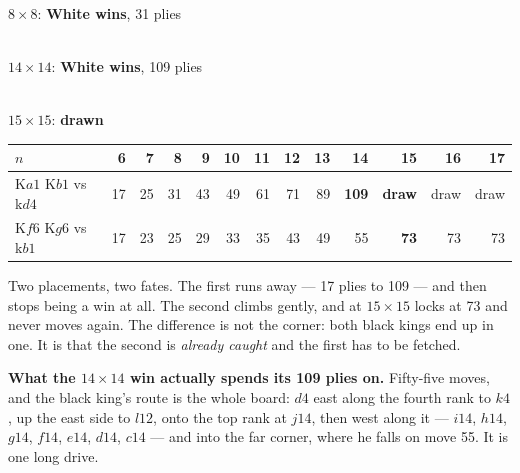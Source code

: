 \documentclass[11pt]{article}
\begin{document}
\smallskip

\begin{minipage}{0.30\textwidth}\centering
  \\[1mm]
  {\scriptsize\color{inksoft}$8\times8$: \textbf{White wins}, 31 plies}
\end{minipage}\hfill
\begin{minipage}{0.32\textwidth}\centering
  \\[1mm]
  {\scriptsize\color{inksoft}$14\times14$: \textbf{White wins}, 109 plies}
\end{minipage}\hfill
\begin{minipage}{0.32\textwidth}\centering
  \\[1mm]
  {\scriptsize\color{inksoft}$15\times15$: \textbf{drawn}}
\end{minipage}

\smallskip

\begin{center}\small
\begin{tabular}{@{}lrrrrrrrrrrrr@{}}
\toprule
$n$ & 6 & 7 & 8 & 9 & 10 & 11 & 12 & 13 & \textbf{14} & \textbf{15} & 16 & 17\\
\midrule
K$a1$ K$b1$ vs k$d4$ & 17 & 25 & 31 & 43 & 49 & 61 & 71 & 89 & \textbf{109} & \textbf{draw} & draw & draw\\
K$f6$ K$g6$ vs k$b1$ & 17 & 23 & 25 & 29 & 33 & 35 & 43 & 49 & 55 & \textbf{73} & 73 & 73\\
\bottomrule
\end{tabular}
\end{center}

\noindent
Two placements, two fates. The first runs away --- 17 plies to 109 --- and then
stops being a win at all. The second climbs gently, and at $15\times15$ locks at
73 and never moves again. The difference is not the corner: both black kings end
up in one. It is that the second is \emph{already caught} and the first has to
be fetched.

\textbf{What the $14\times14$ win actually spends its 109 plies on.} Fifty-five
moves, and the black king's route is the whole board: $d4$ east along the fourth
rank to $k4$, up the east side to $l12$, onto the top rank at $j14$, then west
along it --- $i14$, $h14$, $g14$, $f14$, $e14$, $d14$, $c14$ --- and into the
far corner, where he falls on move 55. It is one long drive.
\end{document}
